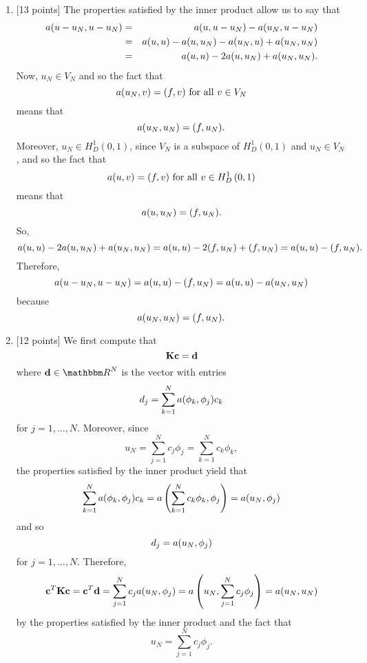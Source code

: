 \begin{solution}
\begin{enumerate}
\item {[13 points]} The properties satisfied by the inner product allow us to say that
\begin{eqnarray*}
a(u-u_N,u-u_N)&=&a(u,u-u_N)-a(u_N,u-u_N)
\\
&=&a(u,u)-a(u,u_N)-a(u_N,u)+a(u_N,u_N)
\\
&=&a(u,u)-2a(u,u_N)+a(u_N,u_N).
\end{eqnarray*}
Now, $u_N\in V_N$ and so the fact that
\[
a(u_N,v)=(f,v)\mbox{ for all }v\in V_N
\]
means that
\[
a(u_N,u_N)=(f,u_N).
\]
Moreover, $u_N\in H^1_D\left(0,1\right)$, since $V_N$ is a subspace of $H^1_D\left(0,1\right)$ and $u_N\in V_N$, and so the fact that
\[
a(u,v)=(f,v)\mbox{ for all }v\in H^1_D\left(0,1\right)
\]
means that
\[
a(u,u_N)=(f,u_N).
\]
So,
\[
a(u,u)-2a(u,u_N)+a(u_N,u_N)=a(u,u)-2(f,u_N)+(f,u_N)=a(u,u)-(f,u_N).
\]
Therefore,
\[
a(u-u_N,u-u_N)=a(u,u)-(f,u_N)=a(u,u)-a(u_N,u_N)
\]
because
\[
a(u_N,u_N)=(f,u_N).
\]

\item {[12 points]} We first compute that
\[
{\bf K}{\bf c}={\bf d}
\]
where $\Bd\in\R^{N}$ is the vector with entries
\[
d_j=\sum_{k=1}^Na(\phi_k,\phi_j)c_k
\]
for $j=1,\ldots,N$. Moreover, since
\[
u_N=\sum_{j=1}^Nc_j\phi_j=\sum_{k=1}^Nc_k\phi_k,
\]
the properties satisfied by the inner product yield that
\[
\sum_{k=1}^Na(\phi_k,\phi_j)c_k=a\left(\sum_{k=1}^Nc_k\phi_k,\phi_j\right)=a(u_N,\phi_j)
\]
and so
\[
d_j=a(u_N,\phi_j)
\]
for $j=1,\ldots,N$. Therefore,
\[
{\bf c}^T{\bf K}{\bf c}={\bf c}^T{\bf d}=\sum_{j=1}^Nc_ja(u_N,\phi_j)=a\left(u_N,\sum_{j=1}^Nc_j\phi_j\right)=a(u_N,u_N)
\]
by the properties satisfied by the inner product and the fact that
\[
u_N=\sum_{j=1}^Nc_j\phi_j.
\]
\end{enumerate}
\end{solution}